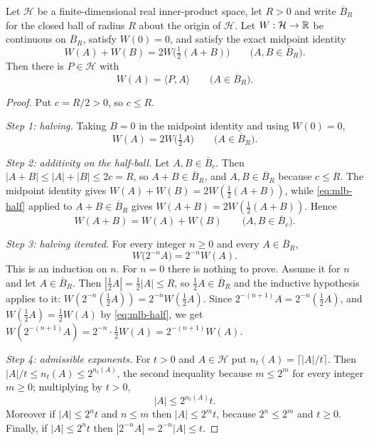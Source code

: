 \begin{lemma}
Let $\mathcal H$ be a finite-dimensional real inner-product space, let $R>0$ and
write $\overline B_R$ for the closed ball of radius $R$ about the origin of
$\mathcal H$. Let $W:\mathcal H\to\mathbb{R}$ be continuous on $\overline B_R$, satisfy
$W(0)=0$, and satisfy the exact midpoint identity
\[
  W(A)+W(B)=2W\bigl(\tfrac12(A+B)\bigr)\qquad\bigl(A,B\in\overline B_R\bigr).
\]
Then there is $P\in\mathcal H$ with
\[
  W(A)=\langle P,A\rangle\qquad\bigl(A\in\overline B_R\bigr).
\]
\end{lemma}
\begin{proof}
Put $c=R/2>0$, so $c\le R$.

\emph{Step 1: halving.} Taking $B=0$ in the midpoint identity and using
$W(0)=0$,
\begin{equation}\label{eq:mlb-half}
  W(A)=2W\bigl(\tfrac12A\bigr)\qquad\bigl(A\in\overline B_R\bigr).
\end{equation}

\emph{Step 2: additivity on the half-ball.} Let $A,B\in\overline B_c$. Then
$|A+B|\le|A|+|B|\le2c=R$, so $A+B\in\overline B_R$, and $A,B\in\overline B_R$
because $c\le R$. The midpoint identity gives
$W(A)+W(B)=2W(\tfrac12(A+B))$, while \eqref{eq:mlb-half} applied to
$A+B\in\overline B_R$ gives $W(A+B)=2W(\tfrac12(A+B))$. Hence
\begin{equation}\label{eq:mlb-add}
  W(A+B)=W(A)+W(B)\qquad\bigl(A,B\in\overline B_c\bigr).
\end{equation}

\emph{Step 3: halving iterated.} For every integer $n\ge0$ and every
$A\in\overline B_R$,
\begin{equation}\label{eq:mlb-pow}
  W\bigl(2^{-n}A\bigr)=2^{-n}W(A).
\end{equation}
This is an induction on $n$. For $n=0$ there is nothing to prove. Assume it for
$n$ and let $A\in\overline B_R$. Then $|\tfrac12A|=\tfrac12|A|\le R$, so
$\tfrac12A\in\overline B_R$ and the inductive hypothesis applies to it:
$W(2^{-n}(\tfrac12A))=2^{-n}W(\tfrac12A)$. Since
$2^{-(n+1)}A=2^{-n}(\tfrac12A)$, and $W(\tfrac12A)=\tfrac12W(A)$ by
\eqref{eq:mlb-half}, we get
$W(2^{-(n+1)}A)=2^{-n}\cdot\tfrac12W(A)=2^{-(n+1)}W(A)$.

\emph{Step 4: admissible exponents.} For $t>0$ and $A\in\mathcal H$ put
$n_t(A)=\lceil|A|/t\rceil$. Then $|A|/t\le n_t(A)\le2^{n_t(A)}$, the second
inequality because $m\le2^m$ for every integer $m\ge0$; multiplying by $t>0$,
\begin{equation}\label{eq:mlb-adm}
  |A|\le2^{n_t(A)}t .
\end{equation}
Moreover if $|A|\le2^nt$ and $n\le m$ then $|A|\le2^mt$, because $2^n\le2^m$ and
$t\ge0$. Finally, if $|A|\le2^nt$ then
$|2^{-n}A|=2^{-n}|A|\le t$.


\end{proof}
